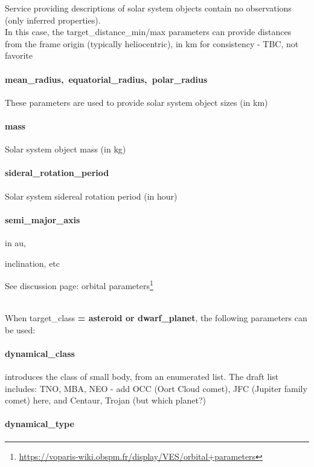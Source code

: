 \documentclass[11pt,a4paper]{ivoa}
\begin{document}
Service providing descriptions of solar system objects contain no observations (only inferred properties).\\In this case, the target\_distance\_min/max parameters can provide distances from the frame origin (typically heliocentric), in km for consistency - TBC, not favorite

\paragraph{mean\_radius, equatorial\_radius, polar\_radius}

These parameters are used to provide solar system object sizes (in km)

\paragraph{mass}

Solar system object mass (in kg)

\paragraph{sideral\_rotation\_period}

Solar system sidereal rotation period (in hour)

\paragraph{semi\_major\_axis}

in au,

inclination, etc

See discussion page: orbital parameters\footnote{\url{https://voparis-wiki.obspm.fr/display/VES/orbital+parameters}}

\\

When target\_class\textbf{ = asteroid or dwarf\_planet}, the following parameters can be used:\textbf{\\}

\paragraph{dynamical\_class}

introduces the class of small body, from an enumerated list. The draft list includes: TNO, MBA, NEO - add OCC (Oort Cloud comet), JFC (Jupiter family comet) here, and Centaur, Trojan (but which planet?)

\paragraph{dynamical\_type}
\end{document}
